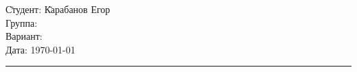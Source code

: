 \begin{tabbing}
	\hspace{11cm} \= Студент: \= Карабанов Егор \\ %
	\> Группа:  \\  %
	\> Вариант:  \\    %
	\> Дата: \> \today     %
\end{tabbing}
\hrule
\vspace{1cm}